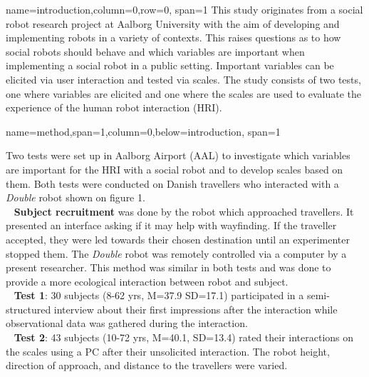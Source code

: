 \documentclass[paperwidth=118cm,paperheight=84cm,landscape,fontscale=0.2941]{baposter}
\begin{document}
\begin{poster}
{name=introduction,column=0,row=0, span=1}
{\parskip 5pt   
This study originates from a social robot research project at Aalborg University with the aim of developing and implementing robots in a variety of contexts. This raises questions as to how social robots should behave and which variables are important when implementing a social robot in a public setting. Important variables can be elicited via user interaction and tested via scales. The study consists of two tests, one where variables are elicited and one where the scales are used to evaluate the experience of the human robot interaction (HRI). %
}

{name=method,span=1,column=0,below=introduction, span=1}
{\parskip 5pt 
Two tests were set up in Aalborg Airport (AAL) to investigate which variables are important for the HRI with a social robot and to develop scales based on them. Both tests were conducted on Danish travellers who interacted with a \textit{Double} robot shown on figure 1.\\
\textbullet~ \textbf{Subject recruitment} was done by the robot which approached travellers. It presented an interface asking if it may help with wayfinding. If the traveller accepted, they were led towards their chosen destination until an experimenter stopped them. The \textit{Double} robot was remotely controlled via a computer by a present researcher. This method was similar in both tests and was done to provide a more ecological interaction between robot and subject.\\
\textbullet~ \textbf{Test 1}: 30 subjects (8-62 yrs, M=37.9 SD=17.1) participated in a semi-structured interview about their first impressions after the interaction while observational data was gathered during the interaction. \\
\textbullet~ \textbf{Test 2}: 43 subjects (10-72 yrs, M=40.1, SD=13.4) rated their interactions on the scales using a PC after their unsolicited interaction. The robot height, direction of approach, and distance to the travellers were varied.
\vspace{-11pt}  

}
\end{poster}
\end{document}
